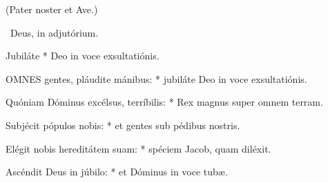 

(Pater noster et Ave.)

\V\ Deus, in adjutórium.

 Jubiláte * Deo in voce exsultatiónis.



\lettrine[lines=2]{O}{MNES} gentes, pláudite mánibus: * jubiláte Deo in voce exsultatiónis.

Quóniam Dóminus excélsus, terríbilis: * Rex magnus super omnem terram.

Subjécit pópulos nobis: * et gentes sub pédibus nostris.

Elégit nobis hereditátem suam: * spéciem Jacob, quam diléxit.

Ascéndit Deus in júbilo: * et Dóminus in voce tubæ.

